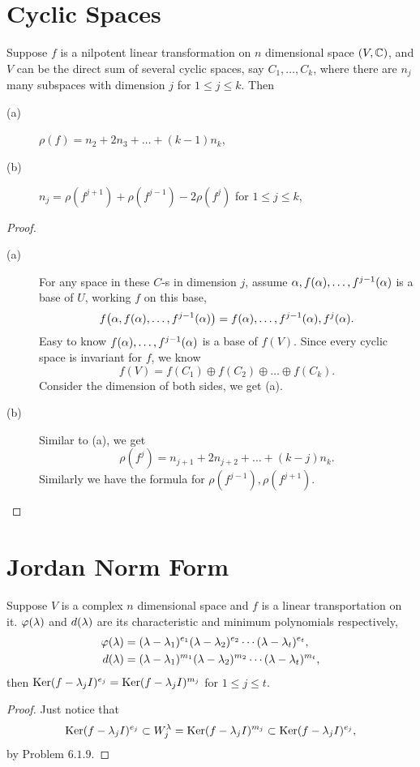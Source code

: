\section{Cyclic Spaces}
\begin{pro}%
	Suppose $f$ is a nilpotent linear transformation on $n$ dimensional space $(V,\mathbb{C})$, and $V$ can be the direct sum of several cyclic spaces, say $C_1,\dots,C_k$, where there are $n_j$ many subspaces with dimension $j$ for $1\leq j\leq k$. Then
	\begin{description}
	\item[(a)] $\rho(f)=n_2+2n_3+\dots+(k-1)n_k$,
	\item[(b)] $n_j=\rho(f^{j+1})+\rho(f^{j-1})-2\rho(f^j)$ for $1\leq j\leq k$,
	\end{description}
\end{pro}
\begin{proof}
	\begin{description}
	\item[(a)] For any space in these $C$-s in dimension $j$, assume $\alpha,f(\alpha),\dots,f^{j-1}(\alpha)$ is a base of $U$, working $f$ on this base,
	\[f\big(\alpha,f(\alpha),\dots,f^{j-1}(\alpha)\big)=f(\alpha),\dots,f^{j-1}(\alpha),f^j(\alpha).\]
	Easy to know $f(\alpha),\dots,f^{j-1}(\alpha)$ is a base of $f(V)$. Since every cyclic space is invariant for $f$, we know
	\[f(V)=f(C_1)\oplus f(C_2)\oplus\dots\oplus f(C_k).\]
	Consider the dimension of both sides, we get (a).
	\item[(b)] Similar to (a), we get
	\[\rho(f^j)=n_{j+1}+2n_{j+2}+\dots+(k-j)n_k.\]
	Similarly we have the formula for $\rho(f^{j-1}),\rho(f^{j+1})$.
	\end{description}
\end{proof}

\section{Jordan Norm Form}
\begin{pro}%
	Suppose $V$ is a complex $n$ dimensional space and $f$ is a linear transportation on it. $\varphi(\lambda)$ and $d(\lambda)$ are its characteristic and minimum polynomials respectively,
	\begin{align*}
	\varphi(\lambda)&=(\lambda-\lambda_1)^{e_1}(\lambda-\lambda_2)^{e_2}\cdots(\lambda-\lambda_t)^{e_t},\\
	d(\lambda)&=(\lambda-\lambda_1)^{m_1}(\lambda-\lambda_2)^{m_2}\cdots(\lambda-\lambda_t)^{m_t},
	\end{align*}
	then $\operatorname*{Ker} (f-\lambda_jI)^{e_j}=\operatorname*{Ker} (f-\lambda_j I)^{m_j}$ for $1\leq j\leq t$.
\end{pro}
\begin{proof}
	Just notice that
	\[\operatorname*{Ker} (f-\lambda_jI)^{e_j}\subset W_j^{\lambda}=\operatorname*{Ker} (f-\lambda_jI)^{m_j}\subset \operatorname*{Ker} (f-\lambda_jI)^{e_j},\]
	by Problem $6.1.9$.
\end{proof}

